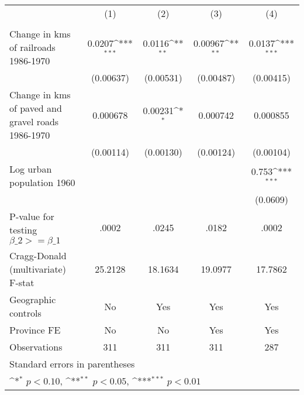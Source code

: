 {
\def\sym#1{\ifmmode^{#1}\else\(^{#1}\)\fi}
\begin{tabular}{l*{4}{c}}
\hline\hline
                &\multicolumn{1}{c}{(1)}&\multicolumn{1}{c}{(2)}&\multicolumn{1}{c}{(3)}&\multicolumn{1}{c}{(4)}\\
                &\multicolumn{1}{c}{}&\multicolumn{1}{c}{}&\multicolumn{1}{c}{}&\multicolumn{1}{c}{}\\
\hline
Change in kms of railroads 1986-1970&   0.0207\sym{***}&   0.0116\sym{**} &  0.00967\sym{**} &   0.0137\sym{***}\\
                &(0.00637)         &(0.00531)         &(0.00487)         &(0.00415)         \\
[1em]
Change in kms of paved and gravel roads 1986-1970& 0.000678         &  0.00231\sym{*}  & 0.000742         & 0.000855         \\
                &(0.00114)         &(0.00130)         &(0.00124)         &(0.00104)         \\
[1em]
Log urban population 1960&                  &                  &                  &    0.753\sym{***}\\
                &                  &                  &                  & (0.0609)         \\
\hline
P-value for testing $\beta\_{2} >= \beta\_{1}$&    .0002         &    .0245         &    .0182         &    .0002         \\
Cragg-Donald (multivariate) F-stat&  25.2128         &  18.1634         &  19.0977         &  17.7862         \\
Geographic controls&       No         &      Yes         &      Yes         &      Yes         \\
Province FE     &       No         &       No         &      Yes         &      Yes         \\
Observations    &      311         &      311         &      311         &      287         \\
\hline\hline
\multicolumn{5}{l}{\footnotesize Standard errors in parentheses}\\
\multicolumn{5}{l}{\footnotesize \sym{*} \(p<0.10\), \sym{**} \(p<0.05\), \sym{***} \(p<0.01\)}\\
\end{tabular}
}
